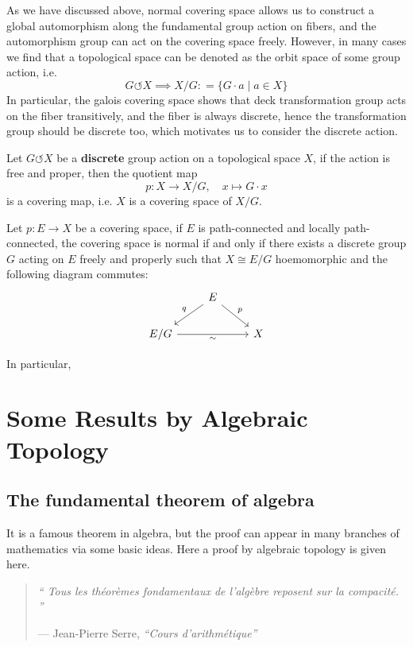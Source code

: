 \documentclass[12pt,a4paper]{article}
\begin{document}
As we have discussed above, normal covering space allows us to construct a global automorphism along the fundamental group action on fibers, and the automorphism group can act on the covering space freely. However, in many cases we find that a topological space can be denoted as the orbit space of some group action, i.e.
\[G \circlearrowleft X  \implies X/G: = \{G\cdot a \mid a \in X\} \]
In particular, the galois covering space shows that deck transformation group acts on the fiber transitively, and the fiber is always discrete, hence the transformation group should be discrete too, which motivates us to consider the discrete action.

\begin{lemma}
    Let \(G \circlearrowleft X\) be a \textbf{discrete} group action on a topological space \(X\), if the action is free and proper, then the quotient map 
    \[p: X \to X/G, \quad x \mapsto G \cdot x\]
    is a covering map, i.e. \(X\) is a covering space of \(X/G\).
\end{lemma}


\begin{proposition}
    Let \(p:E \to X\) be a covering space, if \(E\) is path-connected and locally path-connected, the covering space is normal if and only if there exists a discrete group \(G\) acting on \(E\) freely and properly such that \(X \cong E/G\) hoemomorphic and the following diagram commutes:
\[\begin{tikzcd}
	& E \\
	{E/G} && X
	\arrow["q"', from=1-2, to=2-1]
	\arrow["p", from=1-2, to=2-3]
	\arrow["\sim"', from=2-1, to=2-3]
\end{tikzcd}\]

    In particular,
\end{proposition}















\newpage

\section{Some Results by Algebraic Topology}
\subsection{The fundamental theorem of algebra}
It is a famous theorem in algebra, but the proof can appear in many branches of mathematics via some basic ideas. Here a proof by algebraic topology is given here.
\begin{quote}
\emph{“ Tous les théorèmes fondamentaux de l'algèbre reposent sur la compacité. ”}

\hfill --- Jean-Pierre Serre, \emph{``Cours d'arithmétique''}

\end{quote}
\end{document}
